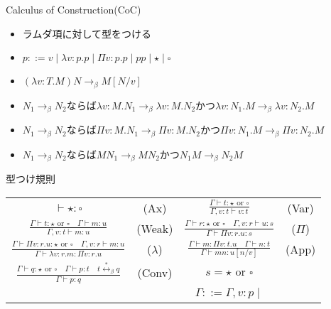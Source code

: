 \documentclass[18pt]{beamer}
\begin{document}
\begin{frame}{Calculus of Construction(CoC)}
 \begin{itemize}
  \item ラムダ項に対して型をつける
  \item $p ::= v \mid \lambda v \colon p. p \mid \Pi v \colon p. p \mid p p \mid \star \mid \square$
  \item $(\lambda v \colon T. M) N \rightarrow_\beta M[N/v]$
  \item $N_1 \rightarrow_\beta N_2$ならば$\lambda v \colon M. N_1 \rightarrow_\beta \lambda v \colon M. N_2$かつ$\lambda v \colon N_1. M \rightarrow_\beta \lambda v \colon N_2. M$
  \item $N_1 \rightarrow_\beta N_2$ならば$\Pi v \colon M. N_1 \rightarrow_\beta \Pi v \colon M. N_2$かつ$\Pi v \colon N_1. M \rightarrow_\beta \Pi v \colon N_2. M$
  \item $N_1 \rightarrow_\beta N_2$ならば$M N_1 \rightarrow_\beta M N_2$かつ$N_1 M \rightarrow_\beta N_2 M$
 \end{itemize}
\end{frame}

\begin{frame}[fragile]{型つけ規則}
\begin{tabular}{cccc}
 $\vdash {\star} {\colon} {\square}$ & (Ax) & $\frac{\Gamma \vdash t {\colon} {\star} \text{ or } {\square}}{\Gamma, v \colon t \vdash v {\colon} t}$ & (Var) \\[30pt]
 $\frac{\Gamma \vdash t {\colon} {\star} \text{ or } \square \quad \Gamma \vdash m {\colon} u}{\Gamma, v \colon t \vdash m {\colon} u}$ & (Weak) & $\frac{\Gamma \vdash r {\colon} {\star} \text{ or } {\square} \quad \Gamma, v \colon r \vdash u {\colon} s}{\Gamma \vdash \Pi v \colon r. u {\colon} s}$ & ($\Pi$) \\[30pt]
 $\frac{\Gamma \vdash \Pi v \colon r. u {\colon} {\star} \text{ or } {\square} \quad \Gamma, v \colon r \vdash m : u}{\Gamma \vdash \lambda v \colon r. m {\colon} \Pi v \colon r. u}$ & ($\lambda$) & $\frac{\Gamma \vdash m : \Pi v \colon t. u \quad \Gamma \vdash n : t}{\Gamma \vdash m n {\colon} u[n/v]}$ & (App) \\[30pt]
 $\frac{\Gamma \vdash q {\colon} {\star} \text{ or } {\square} \quad \Gamma \vdash p {\colon} t \quad t \overset{*}{\leftrightarrow}_\beta q}{\Gamma \vdash p {\colon} q}$ & (Conv) & $s = {\star} \text{ or } {\square}$ & \\[30pt]
& & $\Gamma ::= \Gamma, v \colon p \mid$ & \\
\end{tabular}
\end{frame}
\end{document}
